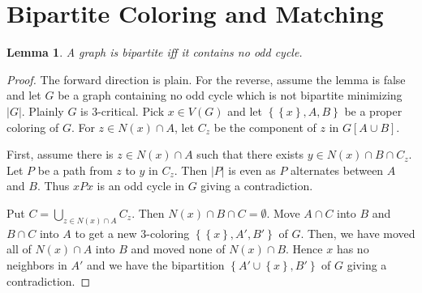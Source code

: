 \documentclass[12pt]{article}
\theoremstyle{plain}
\newtheorem{lem}[thm]{Lemma}
\theoremstyle{definition}
\theoremstyle{remark}
\newcommand{\set}[1]{\left\{ #1 \right\}}
\newcommand{\card}[1]{\left|#1\right|}
\begin{document}
\section{Bipartite Coloring and Matching}

\begin{lem}
A graph is bipartite iff it contains no odd cycle.
\end{lem}
\begin{proof}
The forward direction is plain.  For the reverse, assume the lemma is false and let $G$ be a graph containing no odd cycle which is not bipartite minimizing $\card{G}$.  Plainly $G$ is $3$-critical.  Pick $x \in V(G)$ and let $\set{\set{x}, A, B}$ be a proper coloring of $G$.  For $z \in N(x) \cap A$, let $C_z$ be the component of $z$ in $G[A \cup B]$.  

First, assume there is $z \in N(x) \cap A$ such that there exists $y \in N(x) \cap B \cap C_z$.  Let $P$ be a path from $z$ to $y$ in $C_z$.  Then $\card{P}$ is even as $P$ alternates between $A$ and $B$. Thus $xPx$ is an odd cycle in $G$ giving a contradiction.

Put $C = \bigcup_{z \in N(x) \cap A} C_z$.  Then $N(x) \cap B \cap C = \emptyset$. Move $A \cap C$ into $B$ and $B \cap C$ into $A$ to get a new $3$-coloring $\set{\set{x}, A', B'}$ of $G$.  Then, we have moved all of $N(x) \cap A$ into $B$ and moved none of $N(x) \cap B$.  Hence $x$ has no neighbors in $A'$ and we have the bipartition $\set{A' \cup \set{x}, B'}$ of $G$ giving a contradiction.
\end{proof}
\end{document}
